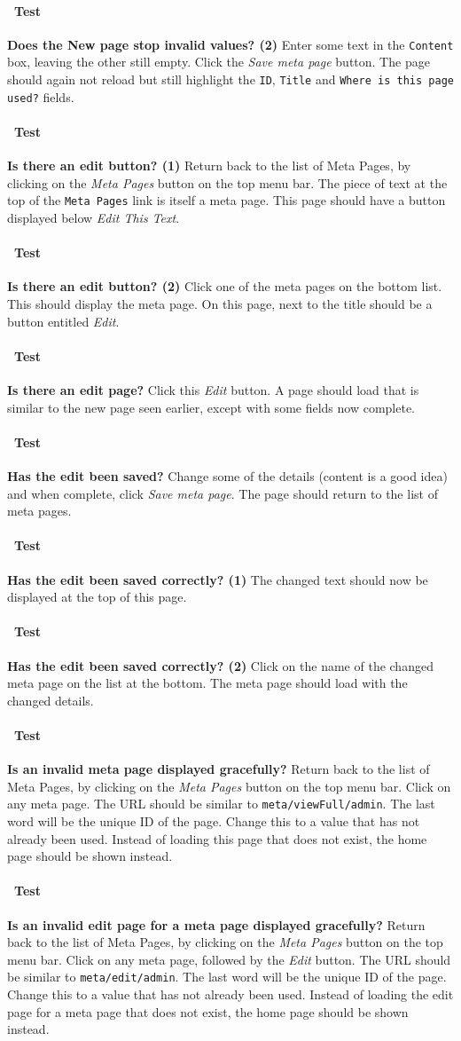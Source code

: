 \documentclass[12pt]{article}
\newcounter{Test}
\newcommand{\test}[1]{%
\stepcounter{Test}%
\paragraph{\Circle\ Test \theTest} \textbf{#1} }
\begin{document}
\test{Does the New page stop invalid values? (2)}
Enter some text in the \texttt{Content} box, leaving the other still empty. Click the \textit{Save meta page} button. The page should again not reload but still highlight the \texttt{ID}, \texttt{Title} and \texttt{Where is this page used?} fields.

\test{Is there an edit button? (1)}
Return back to the list of Meta Pages, by clicking on the \textit{Meta Pages} button on the top menu bar. The piece of text at the top of the \texttt{Meta Pages} link is itself a meta page. This page should have a button displayed below \textit{Edit This Text}.

\test{Is there an edit button? (2)}
Click one of the meta pages on the bottom list. This should display the meta page. On this page, next to the title should be a button entitled \textit{Edit}.

\test{Is there an edit page?}
Click this \textit{Edit} button. A page should load that is similar to the new page seen earlier, except with some fields now complete.

\test{Has the edit been saved?}
Change some of the details (content is a good idea) and when complete, click \textit{Save meta page}. The page should return to the list of meta pages.

\test{Has the edit been saved correctly? (1)}
The changed text should now be displayed at the top of this page.

\test{Has the edit been saved correctly? (2)}
Click on the name of the changed meta page on the list at the bottom. The meta page should load with the changed details.

\test{Is an invalid meta page displayed gracefully?}
Return back to the list of Meta Pages, by clicking on the \textit{Meta Pages} button on the top menu bar. Click on any meta page. The URL should be similar to \texttt{meta/viewFull/admin}. The last word will be the unique ID of the page. Change this to a value that has not already been used. Instead of loading this page that does not exist, the home page should be shown instead.

\test{Is an invalid edit page for a meta page displayed gracefully?}
Return back to the list of Meta Pages, by clicking on the \textit{Meta Pages} button on the top menu bar. Click on any meta page, followed by the \textit{Edit} button. The URL should be similar to \texttt{meta/edit/admin}. The last word will be the unique ID of the page. Change this to a value that has not already been used. Instead of loading the edit page for a meta page that does not exist, the home page should be shown instead.
\end{document}
